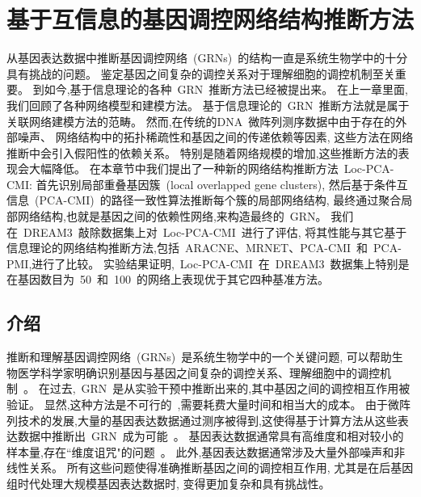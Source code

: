 \section{基于互信息的基因调控网络结构推断方法}
\label{sec:locpcacmi}

从基因表达数据中推断基因调控网络~(GRNs)~的结构一直是系统生物学中的十分具有挑战的问题。
鉴定基因之间复杂的调控关系对于理解细胞的调控机制至关重要。
到如今,基于信息理论的各种~GRN~推断方法已经被提出来。
在上一章里面, 我们回顾了各种网络模型和建模方法。
基于信息理论的~GRN~推断方法就是属于关联网络建模方法的范畴。
然而,在传统的DNA~微阵列测序数据中由于存在的外部噪声、
网络结构中的拓扑稀疏性和基因之间的传递依赖等因素,
这些方法在网络推断中会引入假阳性的依赖关系。
特别是随着网络规模的增加,这些推断方法的表现会大幅降低。
在本章节中我们提出了一种新的网络结构推断方法~Loc-PCA-CMI:
首先识别局部重叠基因簇~(local overlapped gene clusters),
然后基于条件互信息~(PCA-CMI)~的路径一致性算法推断每个簇的局部网络结构,
最终通过聚合局部网络结构,也就是基因之间的依赖性网络,来构造最终的~GRN。
我们在~DREAM3~敲除数据集上对~Loc-PCA-CMI~进行了评估,
将其性能与其它基于信息理论的网络结构推断方法,包括~ARACNE、MRNET、PCA-CMI~和~PCA-PMI,进行了比较。
实验结果证明,~Loc-PCA-CMI~在~DREAM3~数据集上特别是在基因数目为~50~和~100~的网络上表现优于其它四种基准方法。

\subsection{介绍}

推断和理解基因调控网络~(GRNs)~是系统生物学中的一个关键问题, 
可以帮助生物医学科学家明确识别基因与基因之间复杂的调控关系、理解细胞中的调控机制~\cite{altay2010inferring, basso2005reverse}。
在过去,~GRN~是从实验干预中推断出来的,其中基因之间的调控相互作用被验证。
显然,这种方法是不可行的~\cite{elnitski2006locating},需要耗费大量时间和相当大的成本。
由于微阵列技术的发展,大量的基因表达数据通过测序被得到,这使得基于计算方法从这些表达数据中推断出~GRN~成为可能~\cite{maetschke2013supervised}。
基因表达数据通常具有高维度和相对较小的样本量,存在``维度诅咒"的问题~\cite{wang2006inferring}。
此外,基因表达数据通常涉及大量外部噪声和非线性关系。
所有这些问题使得准确推断基因之间的调控相互作用,
尤其是在后基因组时代处理大规模基因表达数据时,
变得更加复杂和具有挑战性。

